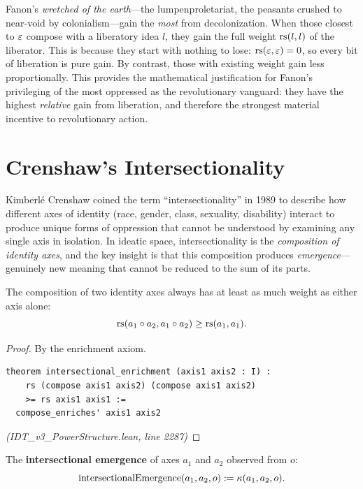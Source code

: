 \begin{interpretation}
Fanon's \emph{wretched of the earth}---the lumpenproletariat, the peasants
crushed to near-void by colonialism---gain the \emph{most} from decolonization.
When those closest to $\varepsilon$ compose with a liberatory idea $l$, they gain
the full weight $\mathrm{rs}(l,l)$ of the liberator. This is because they start with
nothing to lose: $\mathrm{rs}(\varepsilon, \varepsilon) = 0$, so every bit of liberation is pure
gain. By contrast, those with existing weight gain less proportionally.
This provides the mathematical justification for Fanon's privileging of the
most oppressed as the revolutionary vanguard: they have the highest
\emph{relative} gain from liberation, and therefore the strongest material
incentive to revolutionary action.
\end{interpretation}

\section{Crenshaw's Intersectionality}

Kimberlé Crenshaw coined the term ``intersectionality'' in 1989 to describe
how different axes of identity (race, gender, class, sexuality, disability)
interact to produce unique forms of oppression that cannot be understood by
examining any single axis in isolation. In ideatic space, intersectionality
is the \emph{composition of identity axes}, and the key insight is that this
composition produces \emph{emergence}---genuinely new meaning that cannot be
reduced to the sum of its parts.

\begin{theorem}
\label{thm:intersectional-enrichment}
The composition of two identity axes always has at least as much weight as
either axis alone:
\[
  \mathrm{rs}(a_1 \circ a_2, a_1 \circ a_2) \geq \mathrm{rs}(a_1, a_1).
\]
\end{theorem}

\begin{proof}
By the enrichment axiom.
\begin{lstlisting}
theorem intersectional_enrichment (axis1 axis2 : I) :
    rs (compose axis1 axis2) (compose axis1 axis2)
    >= rs axis1 axis1 :=
  compose_enriches' axis1 axis2
\end{lstlisting}
\textit{(IDT\_v3\_PowerStructure.lean, line 2287)}
\end{proof}

\begin{definition}
\label{def:intersectional-emergence}
The \textbf{intersectional emergence} of axes $a_1$ and $a_2$ observed from $o$:
\[
  \mathrm{intersectionalEmergence}(a_1, a_2, o) := \kappa(a_1, a_2, o).
\]
\end{definition}


